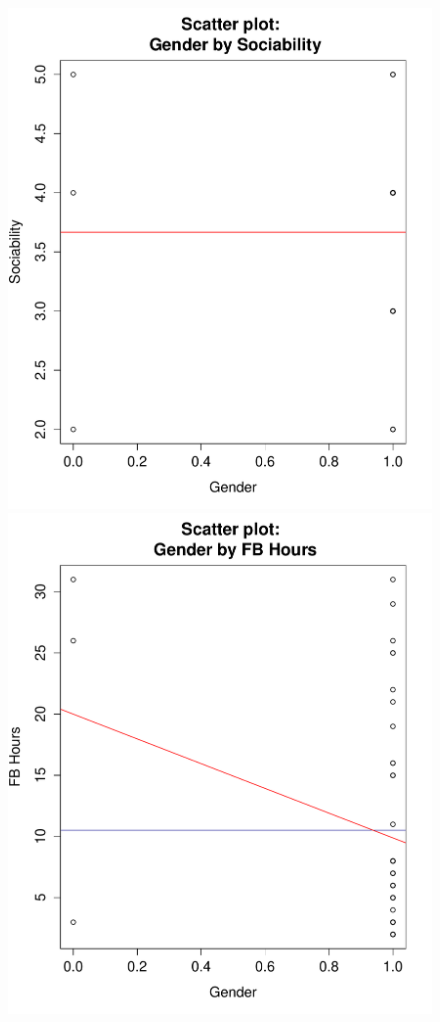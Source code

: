\begin{figure}[H]
\includegraphics[scale=0.44]{./img/scatplot_sociability.pdf}
\includegraphics[scale=0.44]{./img/scatplot_fbhours.pdf}
\end{figure}

